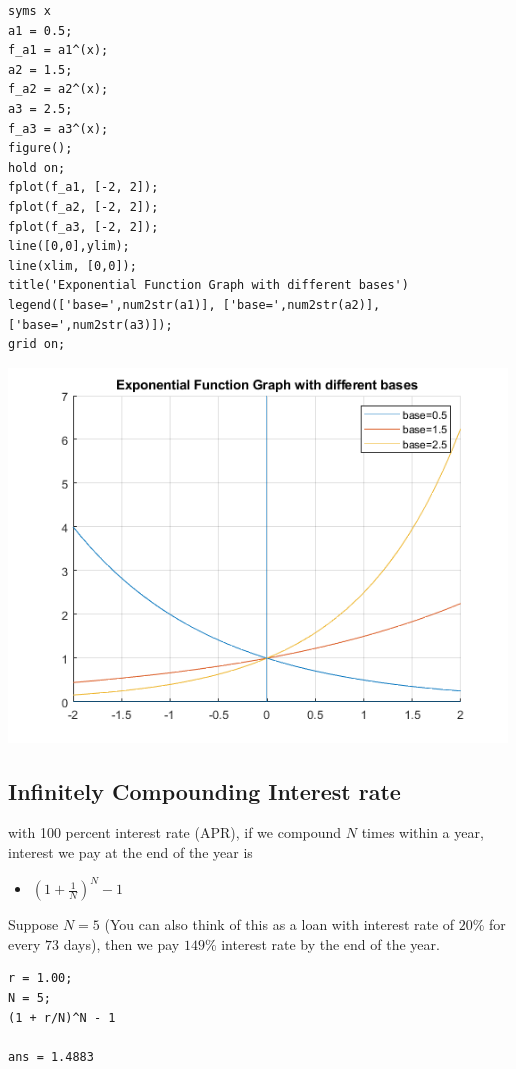 \documentclass[
]{book}
\providecommand{\tightlist}{%
  \setlength{\itemsep}{0pt}\setlength{\parskip}{0pt}}
\begin{document}
\begin{verbatim}
syms x
a1 = 0.5;
f_a1 = a1^(x);
a2 = 1.5;
f_a2 = a2^(x);
a3 = 2.5;
f_a3 = a3^(x);
figure();
hold on;
fplot(f_a1, [-2, 2]);
fplot(f_a2, [-2, 2]);
fplot(f_a3, [-2, 2]);
line([0,0],ylim);
line(xlim, [0,0]);
title('Exponential Function Graph with different bases')
legend(['base=',num2str(a1)], ['base=',num2str(a2)],['base=',num2str(a3)]);
grid on;
\end{verbatim}

\includegraphics[width=5.20833in,height=\textheight]{img/exponential_images/figure_0.png}

\hypertarget{infinitely-compounding-interest-rate}{%
\subsection{Infinitely Compounding Interest rate}\label{infinitely-compounding-interest-rate}}

with 100 percent interest rate (APR), if we compound \(N\) times within a
year, interest we pay at the end of the year is

\begin{itemize}
\tightlist
\item
  \(\displaystyle (1+\frac{1}{N})^N -1\)
\end{itemize}

Suppose \(N=5\) (You can also think of this as a loan with interest rate
of \(20\)\% for every \(73\) days), then we pay \(149\)\% interest rate by the
end of the year.

\begin{verbatim}
r = 1.00;
N = 5;
(1 + r/N)^N - 1

ans = 1.4883
\end{verbatim}
\end{document}
